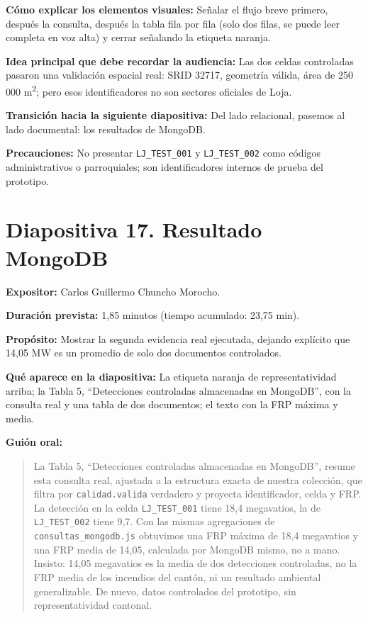 \documentclass[11pt,a4paper]{article}
\newcommand{\campo}[2]{\par\medskip\noindent\textbf{#1:} #2\par}
\newenvironment{guionoral}{%
  \medskip\noindent\textbf{Gui\'on oral:}\par\smallskip
  \begin{quote}\small
}{%
  \end{quote}
}
\newcommand{\separadordiapositiva}{\bigskip\noindent{\color{Tierra!60}\hrulefill}\bigskip}
\begin{document}
\campo{C\'omo explicar los elementos visuales}{Se\~nalar el flujo breve
primero, despu\'es la consulta, despu\'es la tabla fila por fila (solo
dos filas, se puede leer completa en voz alta) y cerrar se\~nalando la
etiqueta naranja.}
\campo{Idea principal que debe recordar la audiencia}{Las dos celdas
controladas pasaron una validaci\'on espacial real: SRID 32717,
geometr\'ia v\'alida, \'area de 250\,000 m\textsuperscript{2}; pero
esos identificadores no son sectores oficiales de Loja.}
\campo{Transici\'on hacia la siguiente diapositiva}{Del lado
relacional, pasemos al lado documental: los resultados de MongoDB.}
\campo{Precauciones}{No presentar \texttt{LJ\_TEST\_001} y
\texttt{LJ\_TEST\_002} como c\'odigos administrativos o parroquiales;
son identificadores internos de prueba del prototipo.}

\separadordiapositiva

\section*{Diapositiva 17. Resultado MongoDB}

\campo{Expositor}{Carlos Guillermo Chuncho Morocho.}
\campo{Duraci\'on prevista}{1,85 minutos (tiempo acumulado: 23,75 min).}
\campo{Prop\'osito}{Mostrar la segunda evidencia real ejecutada, dejando
expl\'icito que 14,05 MW es un promedio de solo dos documentos
controlados.}
\campo{Qu\'e aparece en la diapositiva}{La etiqueta naranja de
representatividad arriba; la Tabla 5, ``Detecciones controladas
almacenadas en MongoDB'', con la consulta real y una tabla de dos
documentos; el texto con la FRP m\'axima y media.}

\begin{guionoral}
La Tabla 5, ``Detecciones controladas almacenadas en MongoDB'', resume
esta consulta real, ajustada a la estructura exacta de nuestra
colecci\'on, que filtra por \texttt{calidad.valida} verdadero y
proyecta identificador, celda y FRP. La detecci\'on en la celda
\texttt{LJ\_TEST\_001} tiene 18,4 megavatios, la de
\texttt{LJ\_TEST\_002} tiene 9,7. Con las
mismas agregaciones de \texttt{consultas\_mongodb.js} obtuvimos una FRP
m\'axima de 18,4 megavatios y una FRP media de 14,05, calculada por
MongoDB mismo, no a mano. Insisto: 14,05 megavatios es la media de dos
detecciones controladas, no la FRP media de los incendios del cant\'on,
ni un resultado ambiental generalizable. De nuevo, datos controlados
del prototipo, sin representatividad cantonal.
\end{guionoral}
\end{document}
